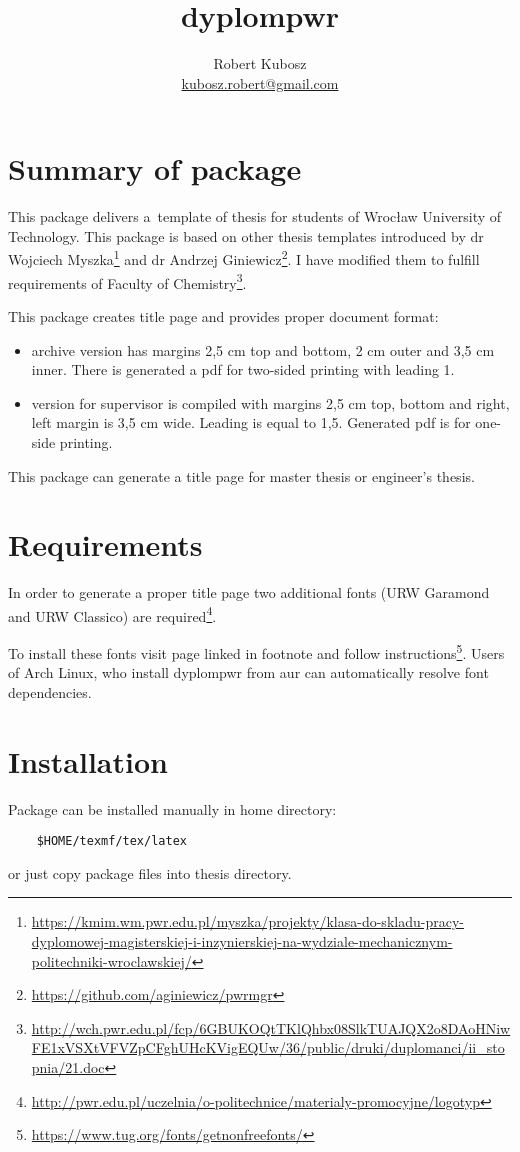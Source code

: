 \documentclass[12pt,a4paper]{article}
\author{Robert Kubosz \\ \href{mailto:kubosz.robert@gmail.com}{kubosz.robert@gmail.com}}
\title{dyplompwr}
\begin{document}
\maketitle
\section{Summary of package}
\label{sec:wstep}
\par This package delivers a~template of thesis for students of Wrocław
University of Technology. This package is based on other thesis templates
introduced by dr Wojciech
Myszka\footnote{\url{https://kmim.wm.pwr.edu.pl/myszka/projekty/klasa-do-skladu-pracy-dyplomowej-magisterskiej-i-inzynierskiej-na-wydziale-mechanicznym-politechniki-wroclawskiej/}}
and dr Andrzej Giniewicz\footnote{\url{https://github.com/aginiewicz/pwrmgr}}.
I have modified them to fulfill requirements of Faculty of
Chemistry\footnote{\url{http://wch.pwr.edu.pl/fcp/6GBUKOQtTKlQhbx08SlkTUAJQX2o8DAoHNiwFE1xVSXtVFVZpCFghUHcKVigEQUw/36/public/druki/duplomanci/ii_stopnia/21.doc}}.
\par This package creates title page and provides proper document format:
\begin{itemize}
    \item archive version has margins 2,5 cm top and bottom, 2 cm outer and 3,5
        cm inner. There is generated a pdf for two-sided printing with leading
        1.
    \item version for supervisor is compiled with margins 2,5 cm top, bottom
        and right, left margin is 3,5 cm wide. Leading is equal to 1,5.
        Generated pdf is for one-side printing.
\end{itemize}
This package can generate a title page for master thesis or engineer's thesis.
\section{Requirements}
\par In order to generate a proper title page two additional fonts (URW
Garamond and URW Classico)  are
required\footnote{\url{http://pwr.edu.pl/uczelnia/o-politechnice/materialy-promocyjne/logotyp}}.
\par To install these fonts visit page linked in footnote and follow
instructions\footnote{\url{https://www.tug.org/fonts/getnonfreefonts/}}. Users
of Arch Linux, who install dyplompwr from aur can automatically resolve font
dependencies.

\section{Installation}
Package can be installed manually in home directory:
\begin{verbatim}
    $HOME/texmf/tex/latex
\end{verbatim}
or just copy package files into thesis directory.
\end{document}
